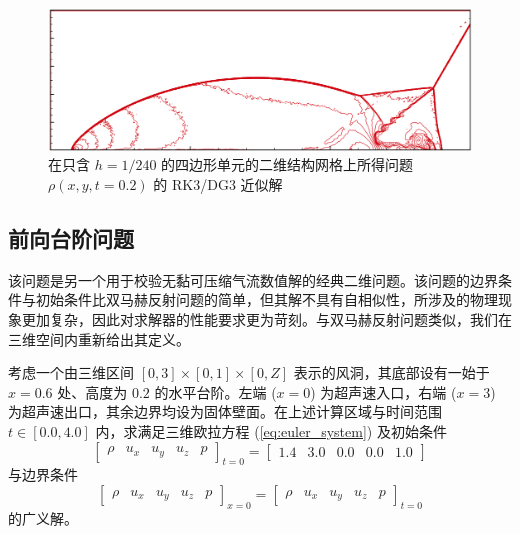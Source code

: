 \begin{figure}[h!]
\begin{centering}
\includegraphics[width=1\textwidth]{figures/double_mach/zhong}
\par\end{centering}
\caption{\label{fig:double_mach_p=00003D3_zhong}在只含 $h=1/240$ 的四边形单元的二维结构网格上所得问题
$\rho(x,y,t=0.2)$ 的 RK3/DG3 近似解}
\end{figure}

\newpage{}

\subsection{前向台阶问题}

该问题是另一个用于校验无黏可压缩气流数值解的经典二维问题。该问题的边界条件与初始条件比双马赫反射问题的简单，但其解不具有自相似性，所涉及的物理现象更加复杂，因此对求解器的性能要求更为苛刻。与双马赫反射问题类似，我们在三维空间内重新给出其定义。
\begin{problem}
[前向台阶]\label{prob:=00524D=005411=0053F0=009636}考虑一个由三维区间
$[0,3]\times[0,1]\times[0,Z]$ 表示的风洞，其底部设有一始于 $x=0.6$ 处、高度为 $0.2$
的水平台阶。左端 ($x=0$) 为超声速入口，右端 ($x=3$) 为超声速出口，其余边界均设为固体壁面。在上述计算区域与时间范围
$t\in[0.0,4.0]$ 内，求满足三维欧拉方程 (\ref{eq:euler_system}) 及初始条件
\begin{equation}
\begin{bmatrix}\rho & u_{x} & u_{y} & u_{z} & p\end{bmatrix}_{t=0}=\begin{bmatrix}1.4 & 3.0 & 0.0 & 0.0 & 1.0\end{bmatrix}
\end{equation}
与边界条件
\begin{equation}
\begin{bmatrix}\rho & u_{x} & u_{y} & u_{z} & p\end{bmatrix}_{x=0}=\begin{bmatrix}\rho & u_{x} & u_{y} & u_{z} & p\end{bmatrix}_{t=0}
\end{equation}
的广义解。
\end{problem}

